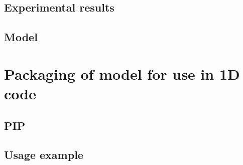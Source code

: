 \documentclass{article}
\begin{document}
\subsection{Experimental results}

\subsection{Model}

\section{Packaging of model for use in 1D code}

\subsection{PIP}

\subsection{Usage example}


	\printbibliography
\end{document}
